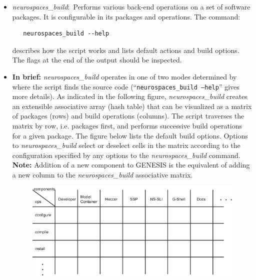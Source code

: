 \documentclass[12pt]{article}
\begin{document}
\begin{itemize}
   \item {\it neurospaces\_build}:\,\,\,Performs various back-end operations on a set of software packages. It is configurable in its packages and operations. The command:
      \begin{verbatim}
   neurospaces_build --help
      \end{verbatim}
describes how the script works and lists default actions and build options. The flags at the end of the output should be inspected.

   \item {\bf In brief:} {\it neurospaces\_build} operates in one of two modes determined by where the script finds the source code (``{\tt neurospaces\_build --help}'' gives more details). As indicated in the following figure, {\it neurospaces\_build} creates an extensible associative array (hash table) that can be visualized as a matrix of packages (rows) and build operations (columns). The script traverses the matrix by row, i.e. packages first, and performs successive build operations for a given package. The figure below  lists the default build options. Options to {\it neurospaces\_build} select or deselect cells in the matrix according to the configuration specified by any options to the {\it neurospaces\_build} command. {\bf Note:} Addition of a new component to GENESIS is the equivalent of adding a new column to the {\it neurospaces\_build} associative matrix.
   
\begin{figure}[h]
   \centering
   \includegraphics[scale=0.7]{figures/build-matrix.eps}
\end{figure}
   

\end{itemize}
\end{document}
